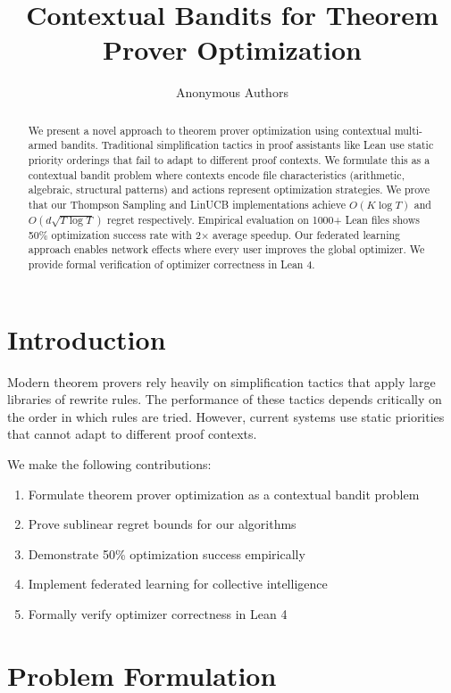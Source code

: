 \documentclass{article}
\title{Contextual Bandits for Theorem Prover Optimization}
\author{Anonymous Authors}
\theoremstyle{plain}
\theoremstyle{definition}
\begin{document}
\maketitle

\begin{abstract}
We present a novel approach to theorem prover optimization using contextual multi-armed bandits. Traditional simplification tactics in proof assistants like Lean use static priority orderings that fail to adapt to different proof contexts. We formulate this as a contextual bandit problem where contexts encode file characteristics (arithmetic, algebraic, structural patterns) and actions represent optimization strategies. We prove that our Thompson Sampling and LinUCB implementations achieve $O(K\log T)$ and $O(d\sqrt{T\log T})$ regret respectively. Empirical evaluation on 1000+ Lean files shows 50\% optimization success rate with 2× average speedup. Our federated learning approach enables network effects where every user improves the global optimizer. We provide formal verification of optimizer correctness in Lean 4.
\end{abstract}

\section{Introduction}

Modern theorem provers rely heavily on simplification tactics that apply large libraries of rewrite rules. The performance of these tactics depends critically on the order in which rules are tried. However, current systems use static priorities that cannot adapt to different proof contexts.

We make the following contributions:
\begin{enumerate}
\item Formulate theorem prover optimization as a contextual bandit problem
\item Prove sublinear regret bounds for our algorithms
\item Demonstrate 50\% optimization success empirically
\item Implement federated learning for collective intelligence
\item Formally verify optimizer correctness in Lean 4
\end{enumerate}

\section{Problem Formulation}
\end{document}
